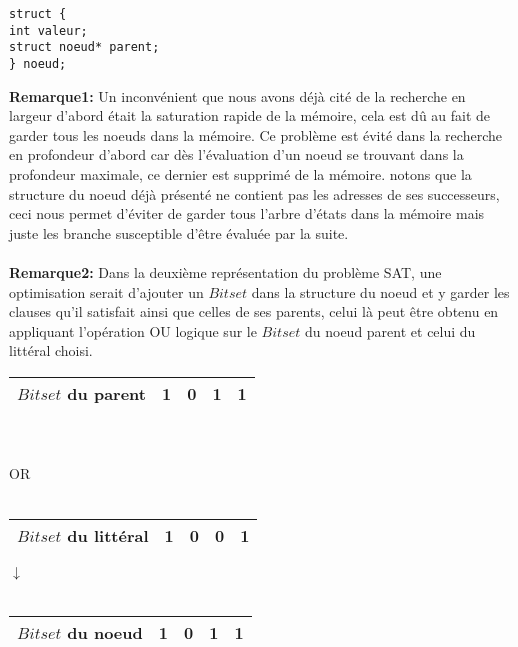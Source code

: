 \begin{lstlisting}
struct {
int valeur; 
struct noeud* parent;
} noeud;
\end{lstlisting}

\textbf{Remarque1:} Un inconvénient que nous avons déjà cité de la recherche en largeur d’abord était la saturation rapide de la mémoire, cela est dû au fait de garder tous les noeuds dans la mémoire. Ce problème est évité dans la recherche en profondeur d’abord car dès l’évaluation d’un noeud se trouvant dans la profondeur maximale, ce dernier est supprimé de la mémoire. notons que la structure du noeud déjà présenté ne contient pas les adresses de ses successeurs, ceci nous permet d’éviter de garder tous l’arbre d’états dans la mémoire mais juste les branche susceptible d’être évaluée par la suite.\\~\\
\textbf{Remarque2:} Dans la deuxième représentation du problème SAT, une optimisation serait d’ajouter un $Bitset$ dans la structure du noeud et y garder les clauses qu’il satisfait ainsi que celles de ses parents, celui là peut être obtenu en appliquant l’opération OU logique sur le $Bitset$ du noeud parent et celui du littéral choisi.\\
\begin{center}
	\begin{minipage}{0.5\textwidth}
		\centering
		\begin{tabular}{|c | c| c| c|c|}
			\hline
			$Bitset$ du parent& 1 & 0 & 1 & 1 \\\hline
		\end{tabular}
	\end{minipage}
	\\~\\
	OR
	\\~\\
	\begin{minipage}{0.5\textwidth}
		\centering
		\begin{tabular}{|c | c| c| c|c|}
			\hline
			$Bitset$ du littéral& 1 & 0 & 0 & 1\\\hline
		\end{tabular}
	\end{minipage}
	\begin{center}

		$\downarrow$
		\\~\\
		\begin{tabular}{|c | c| c| c|c|}
			\hline
			$Bitset$ du noeud& 1 & 0 & 1 & 1\\\hline
		\end{tabular}
	\end{center}
\end{center}

